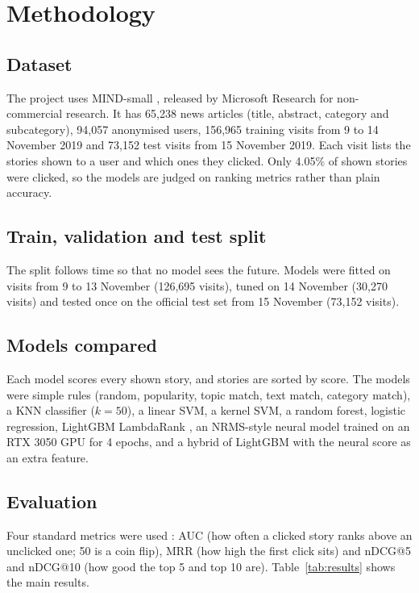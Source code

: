 \documentclass[12pt,a4paper,oneside]{report}
\begin{document}
\section{Methodology}

\subsection{Dataset}
The project uses MIND-small \cite{wu2020}, released by Microsoft Research for non-commercial research. It
has 65,238 news articles (title, abstract, category and subcategory), 94,057 anonymised users, 156,965
training visits from 9 to 14 November 2019 and 73,152 test visits from 15 November 2019. Each visit lists
the stories shown to a user and which ones they clicked. Only 4.05\% of shown stories were clicked, so the
models are judged on ranking metrics rather than plain accuracy.

\subsection{Train, validation and test split}
The split follows time so that no model sees the future. Models were fitted on visits from 9 to 13
November (126,695 visits), tuned on 14 November (30,270 visits) and tested once on the official test set
from 15 November (73,152 visits).

\subsection{Models compared}
Each model scores every shown story, and stories are sorted by score. The models were simple rules
(random, popularity, topic match, text match, category match), a KNN classifier ($k=50$), a linear SVM, a
kernel SVM, a random forest, logistic regression, LightGBM LambdaRank \cite{ke2017}, an NRMS-style neural
model \cite{wu2019} trained on an RTX 3050 GPU for 4 epochs, and a hybrid of LightGBM with the neural score
as an extra feature.

\subsection{Evaluation}
Four standard metrics were used \cite{wu2020}: AUC (how often a clicked story ranks above an unclicked
one; 50 is a coin flip), MRR (how high the first click sits) and nDCG@5 and nDCG@10 (how good the top 5
and top 10 are). Table~\ref{tab:results} shows the main results.
\end{document}
